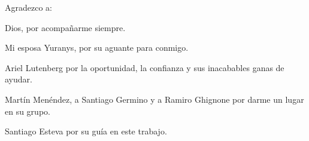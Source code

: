 \documentclass[
11pt, %
spanish,
singlespacing, %
parskip, %
headsepline, %
]{MastersDoctoralThesis} %
\author{Ing. Luis David Díaz Charris} %
\begin{document}
\frontmatter %

\pagestyle{plain} %



\begin{abstract}
\addchaptertocentry{\abstractname} %
%
\centering

En esta memoria se describe el diseño y desarrollo de un prototipo de dispositivo de geolocalización basado en tecnología GNSS. Este permite reportar la posición geográfica de una cava móvil de transporte de alimentos con una exactitud mínima de diez metros. El prototipo implementa un receptor de señales GNSS capaz de recibir simultáneamente señales de los sistemas GPS y BeiDou, además de incorporar comunicación 4G, lo que permite la posibilidad de transmitir datos vía internet a una aplicación web de monitoreo en tiempo real. 

Para el desarrollo del presente trabajo, se aplicaron conocimientos en planificación y gestión de proyectos, ingeniería del software para sistemas embebidos, programación de microcontroladores, sistemas operativos en tiempo real, diseño de circuitos impresos y protocolos de comunicación. 

\end{abstract}


\begin{acknowledgements}
\vspace{1.5cm}

Agradezco a:

Dios, por acompañarme siempre. 

Mi esposa Yuranys, por su aguante para conmigo. 

Ariel Lutenberg por la oportunidad, la confianza y sus inacabables ganas de ayudar. 

Martín Menéndez, a Santiago Germino y a Ramiro Ghignone por darme un lugar en su grupo. 

Santiago Esteva por su guía en este trabajo. 

\end{acknowledgements}
\end{document}
